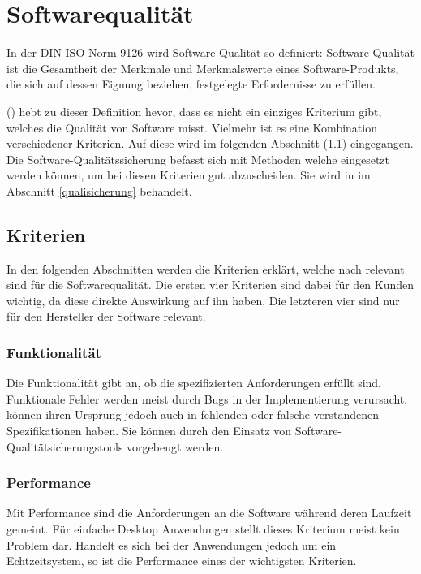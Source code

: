 
\section{Softwarequalität}\label{softwarequality}
In der DIN-ISO-Norm 9126 wird Software Qualität so definiert:
\dq Software-Qualität ist die Gesamtheit der Merkmale und Merkmalswerte eines Software-Produkts, die sich auf dessen Eignung beziehen, festgelegte Erfordernisse zu erfüllen.\dq

\citeauthor{hoffmann2013software} (\citeyear{hoffmann2013software}) hebt zu dieser Definition hevor, dass es nicht ein einziges Kriterium gibt, welches die Qualität von Software misst.
Vielmehr ist es eine Kombination verschiedener Kriterien.
Auf diese wird im folgenden Abschnitt (\ref{kriterien}) eingegangen.
Die Software-Qualitätssicherung befasst sich mit Methoden welche eingesetzt werden können, um bei diesen Kriterien gut abzuscheiden.
Sie wird in im Abschnitt \ref{qualisicherung} behandelt.

\subsection{Kriterien}\label{kriterien}
In den folgenden Abschnitten werden die Kriterien erklärt, welche nach \citeauthor{hoffmann2013software} relevant sind für die Softwarequalität.
Die ersten vier Kriterien sind dabei für den Kunden wichtig, da diese direkte Auswirkung auf ihn haben.
Die letzteren vier sind nur für den Hersteller der Software relevant.
\subsubsection{Funktionalität}
Die Funktionalität gibt an, ob die spezifizierten Anforderungen erfüllt sind.
Funktionale Fehler werden meist durch Bugs in der Implementierung verursacht, können ihren Ursprung jedoch auch in fehlenden oder falsche verstandenen Spezifikationen haben.
Sie können durch den Einsatz von Software-Qualitätsicherungstools vorgebeugt werden.

\subsubsection{Performance}
Mit Performance sind die Anforderungen an die Software während deren Laufzeit gemeint.
Für einfache Desktop Anwendungen stellt dieses Kriterium meist kein Problem dar.
Handelt es sich bei der Anwendungen jedoch um ein Echtzeitsystem, so ist die Performance eines der wichtigsten Kriterien.

